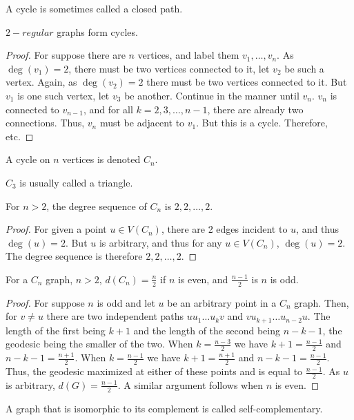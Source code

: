     A cycle is sometimes called a closed path.
    \begin{theorem}
    $2-regular$ graphs form cycles.
    \end{theorem}
    \begin{proof}
    For suppose there are $n$ vertices, and label them $v_1,\hdots, v_n$. As $\deg(v_1)=2$, there must be two vertices connected to it, let $v_2$ be such a vertex. Again, as $\deg(v_2)=2$ there must be two vertices connected to it. But $v_1$ is one such vertex, let $v_3$ be another. Continue in the manner until $v_n$. $v_n$ is connected to $v_{n-1}$, and for all $k=2,3,\hdots, n-1$, there are already two connections. Thus, $v_n$ must be adjacent to $v_1$. But this is a cycle. Therefore, etc.
    \end{proof}
    \begin{definition}
    A cycle on $n$ vertices is denoted $C_n$.
    \end{definition}
    $C_3$ is usually called a triangle.
    \begin{theorem}
    For $n>2$, the degree sequence of $C_n$ is $2,2,\hdots, 2$.
    \end{theorem}
    \begin{proof}
    For given a point $u\in V(C_n)$, there are 2 edges incident to $u$, and thus $\deg(u) = 2$. But $u$ is arbitrary, and thus for any $u\in V(C_n)$, $\deg(u) = 2$. The degree sequence is therefore $2,2,\hdots, 2$.
    \end{proof}
    \begin{theorem}
    For a $C_n$ graph, $n>2$, $d(C_n) = \frac{n}{2}$ if $n$ is even, and $\frac{n-1}{2}$ is $n$ is odd.
    \end{theorem}
    \begin{proof}
    For suppose $n$ is odd and let $u$ be an arbitrary point in a $C_n$ graph. Then, for $v\ne u$ there are two independent paths $uu_1\hdots u_k v$ and $vu_{k+1}\hdots u_{n-2}u$. The length of the first being $k+1$ and the length of the second being $n-k-1$, the geodesic being the smaller of the two. When $k= \frac{n-3}{2}$ we have $k+1 = \frac{n-1}{2}$ and $n-k-1 = \frac{n+1}{2}$. When $k=\frac{n-1}{2}$ we have $k+1 = \frac{n+1}{2}$ and $n-k-1 = \frac{n-1}{2}$. Thus, the geodesic maximized at either of these points and is equal to $\frac{n-1}{2}$. As $u$ is arbitrary, $d(G) = \frac{n-1}{2}$. A similar argument follows when $n$ is even.
    \end{proof}
    \begin{definition}
    A graph that is isomorphic to its complement is called self-complementary.
    \end{definition}
